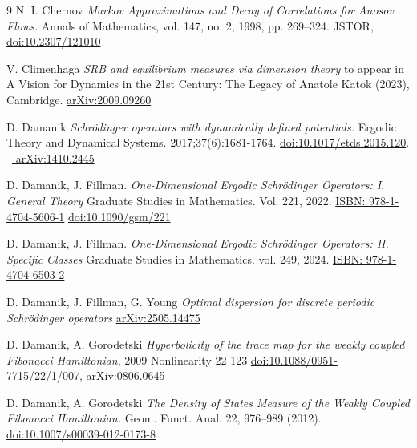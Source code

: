 \documentclass[a4paper]{article}
\theoremstyle{definition}
\begin{document}
\begin{thebibliography}{9}
    {N. I. Chernov}
    \emph{Markov Approximations and Decay of Correlations for Anosov Flows.}
    Annals of Mathematics, vol. 147, no. 2, 1998, pp. 269–324. JSTOR, \href{https://doi.org/10.2307/121010}{doi:10.2307/121010}


    {V. Climenhaga}
    \emph{SRB and equilibrium measures via dimension theory}
    to appear in A Vision for Dynamics in the 21st Century: The Legacy of Anatole Katok (2023), Cambridge. 
    \href{https://arxiv.org/abs/2009.09260}{arXiv:2009.09260}


    {D. Damanik}
    \emph{Schrödinger operators with dynamically defined potentials.}
    Ergodic Theory and Dynamical Systems. 2017;37(6):1681-1764. \href{https://www.cambridge.org/core/journals/ergodic-theory-and-dynamical-systems/article/schrodinger-operators-with-dynamically-defined-potentials/53720BF2FD93FE1C8EBD39F76539BF42}{doi:10.1017/etds.2015.120}. \ \href{https://arxiv.org/abs/1410.2445}{	arXiv:1410.2445}


    {D. Damanik, J. Fillman.}
    \emph{One-Dimensional Ergodic Schrödinger Operators: I. General Theory}
     Graduate Studies in Mathematics. Vol. 221, 2022. \href{https://www.ams.org/publications/authors/books/postpub/gsm-221}{ISBN: 978-1-4704-5606-1}
    \href{https://doi.org/10.1090/gsm/221}{doi:10.1090/gsm/221}



    {D. Damanik, J. Fillman.}
    \emph{One-Dimensional Ergodic Schrödinger Operators: II. Specific Classes}
     Graduate Studies in Mathematics. vol. 249, 2024. \href{https://bookstore.ams.org/GSM/249}{ISBN: 978-1-4704-6503-2}

    {D. Damanik, J. Fillman, G. Young}
    \emph{Optimal dispersion for discrete periodic Schrödinger operators}
    \href{https://arxiv.org/pdf/2505.14475}{arXiv:2505.14475}


    {D. Damanik, A. Gorodetski}
    \emph{Hyperbolicity of the trace map for the weakly coupled Fibonacci Hamiltonian}, 2009 Nonlinearity 22 123
    \href{https://iopscience.iop.org/article/10.1088/0951-7715/22/1/007}{doi:10.1088/0951-7715/22/1/007}, \href{https://arxiv.org/abs/0806.0645}{arXiv:0806.0645}

    {D. Damanik, A. Gorodetski}
    \emph{The Density of States Measure of the Weakly Coupled Fibonacci Hamiltonian.}
    Geom. Funct. Anal. 22, 976–989 (2012). \href{https://doi.org/10.1007/s00039-012-0173-8}{doi:10.1007/s00039-012-0173-8}




\end{thebibliography}
\end{document}
